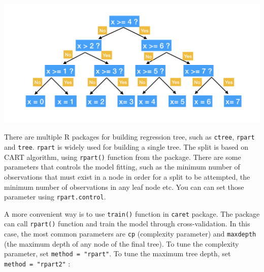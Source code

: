 \documentclass[12pt,]{krantz}
\begin{document}
\includegraphics{images/BinaryTree.png}

There are multiple R packages for building regression tree, such as \texttt{ctree}, \texttt{rpart} and \texttt{tree}. \texttt{rpart} is widely used for building a single tree. The split is based on CART algorithm, using \texttt{rpart()} function from the package. There are some parameters that controls the model fitting, such as the minimum number of observations that must exist in a node in order for a split to be attempted, the minimum number of observations in any leaf node etc. You can can set those parameter using \texttt{rpart.control}.

A more convenient way is to use \texttt{train()} function in \texttt{caret} package. The package can call \texttt{rpart()} function and train the model through cross-validation. In this case, the most common parameters are \texttt{cp} (complexity parameter) and \texttt{maxdepth} (the maximum depth of any node of the final tree). To tune the complexity parameter, set \texttt{method\ =\ "rpart"}. To tune the maximum tree depth, set \texttt{method\ =\ "rpart2"} :
\end{document}
